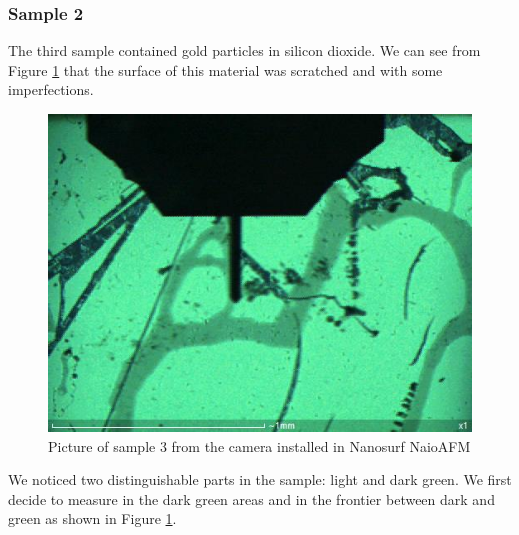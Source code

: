 \documentclass[11pt,a4paper]{article}
\begin{document}
\subsubsection{Sample 2}
The third sample contained gold particles in silicon dioxide. We can see from Figure \ref{fig:sample_3_static} that the surface of this material was scratched and with some imperfections.

\begin{figure}[H]
\centering
\includegraphics[scale=0.4]{sm_sample2_set.JPG}
\caption{Picture of sample 3 from the camera installed in Nanosurf NaioAFM}
\label{fig:sample_3_static}
\end{figure}

We noticed two distinguishable parts in the sample: light and dark green. We first decide to measure in the dark green areas and in the frontier between dark and green as shown in Figure \ref{fig:sample_3_static}.
\end{document}
